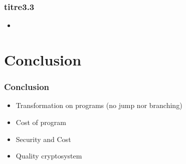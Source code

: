 \documentclass{beamer}
\begin{document}
\begin{frame} \frametitle{titre3.3}
  \begin{itemize}
  \item {}
  \end{itemize}
\end{frame}

\section[Conclusion]{Conclusion}

\begin{frame}
  \frametitle{Conclusion}
  \begin{itemize}
  \item Transformation on programs (no jump nor branching)

  \item Cost of program

  \item Security and Cost

  \item Quality cryptosystem
  \end{itemize}
\end{frame}
\end{document}
